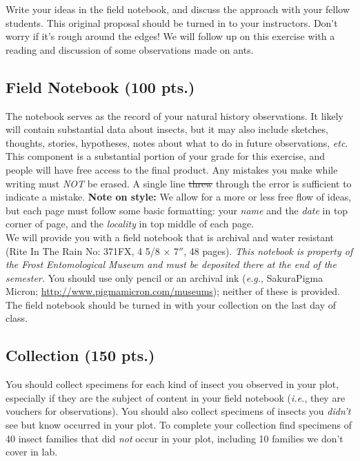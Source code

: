 \documentclass[letterpaper, 11pt]{article}
\begin{document}
\noindent{}Write your ideas in the field notebook, and discuss the approach with your fellow students. This original proposal should be turned in to your instructors. Don't worry if it's rough around the edges! We will follow up on this exercise with a reading and discussion of some observations \cite{Darwin1859} made on ants.

\subsection*{Field Notebook (100 pts.)}
The notebook serves as the record of your natural history observations. It likely will contain substantial data about insects, but it may also include sketches, thoughts, stories, hypotheses, notes about what to do in future observations, \textit{etc}. This component is a substantial portion of your grade for this exercise, and people will have free access to the final product. Any mistakes you make while writing must \textit{NOT} be erased. A single line \sout{threw} through the error is sufficient to indicate a mistake. \textbf{Note on style:} We allow for a more or less free flow of ideas, but each page must follow some basic formatting: your \textit{name} and the \textit{date} in top corner of page, and the \textit{locality} in top middle of each page.\\

\noindent{}We will provide you with a field notebook that is archival and water resistant (Rite In The Rain No: 371FX, 4 5/8 $\times$ 7$''$, 48 pages). \textit{This notebook is property of the Frost Entomological Museum and must be deposited there at the end of the semester.} You should use only pencil or an archival ink (\textit{e.g.}, Sakura\textregistered{ }Pigma Micron\textregistered; \url{http://www.pigmamicron.com/museums}); neither of these is provided. The field notebook should be turned in with your collection on the last day of class.

\subsection*{Collection (150 pts.)}
You should collect specimens for each kind of insect you observed in your plot, especially if they are the subject of content in your field notebook (\textit{i.e.}, they are vouchers for observations). You should also collect specimens of insects you \textit{didn't} see but know occurred in your plot. To complete your collection find specimens of 40 insect families that did \textit{not} occur in your plot, including 10 families we don't cover in lab.\\
\end{document}
